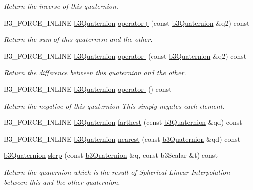 \begin{CompactItemize}
\begin{CompactList}\small\item\em Return the inverse of this quaternion. \item\end{CompactList}\item 
B3\_\-FORCE\_\-INLINE \hyperlink{classb3_quaternion}{b3Quaternion} \hyperlink{classb3_quaternion_67190e0235b14f9d062f8616221665cf}{operator+} (const \hyperlink{classb3_quaternion}{b3Quaternion} \&q2) const 
\begin{CompactList}\small\item\em Return the sum of this quaternion and the other. \item\end{CompactList}\item 
B3\_\-FORCE\_\-INLINE \hyperlink{classb3_quaternion}{b3Quaternion} \hyperlink{classb3_quaternion_67a697c45563268c8ff6da91bb4d6fea}{operator-} (const \hyperlink{classb3_quaternion}{b3Quaternion} \&q2) const 
\begin{CompactList}\small\item\em Return the difference between this quaternion and the other. \item\end{CompactList}\item 
\hypertarget{classb3_quaternion_6444b48c137763cd1ebca17dadd2ea2a}{
B3\_\-FORCE\_\-INLINE \hyperlink{classb3_quaternion}{b3Quaternion} \hyperlink{classb3_quaternion_6444b48c137763cd1ebca17dadd2ea2a}{operator-} () const }
\label{classb3_quaternion_6444b48c137763cd1ebca17dadd2ea2a}

\begin{CompactList}\small\item\em Return the negative of this quaternion This simply negates each element. \item\end{CompactList}\item 
B3\_\-FORCE\_\-INLINE \hyperlink{classb3_quaternion}{b3Quaternion} \hyperlink{classb3_quaternion_388e68921f4749a5641df37449076db0}{farthest} (const \hyperlink{classb3_quaternion}{b3Quaternion} \&qd) const 
\item 
B3\_\-FORCE\_\-INLINE \hyperlink{classb3_quaternion}{b3Quaternion} \hyperlink{classb3_quaternion_c257faeb2bf5a223870603face96f002}{nearest} (const \hyperlink{classb3_quaternion}{b3Quaternion} \&qd) const 
\item 
\hyperlink{classb3_quaternion}{b3Quaternion} \hyperlink{classb3_quaternion_9b64bb67f4ece30723d963132478049c}{slerp} (const \hyperlink{classb3_quaternion}{b3Quaternion} \&q, const b3Scalar \&t) const 
\begin{CompactList}\small\item\em Return the quaternion which is the result of Spherical Linear Interpolation between this and the other quaternion. \item\end{CompactList}\end{CompactItemize}



